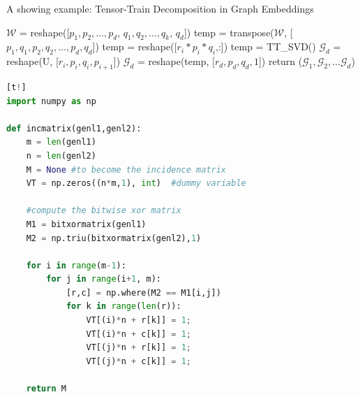 \begin{algorithm} [t]
\footnotesize
  \SetAlgoLined
  \DontPrintSemicolon
  \caption{A showing example: Tensor-Train Decomposition in Graph Embeddings}
  $\mathcal{W}$ = reshape([$p_1, p_2, \dots, p_d$, $q_1, q_2, \dots, q_k$, $q_d$]) \;
  temp = transpose($\mathcal{W}$, [$p_1, q_1, p_2, q_2, \dots, p_d, q_d$]) \;
   {
    temp = reshape([$r_i * p_i * q_i$,:]) \;
    temp = TT\_SVD() \; 
    $\mathcal{G}_d$ = reshape(U, [$r_i, p_i, q_i, p_{i+1}$]) \;
  }
  $\mathcal{G}_d$ = reshape(temp, [$r_d, p_d, q_d, 1$]) \;
  return ($\mathcal{G}_1, \mathcal{G}_2, \dots \mathcal{G}_d$) \;
  \label{alg:example}
\end{algorithm}



\lstset{style=classicstyle}
\begin{lstlisting}[language=Python, caption=Python example][t!]
import numpy as np
    
def incmatrix(genl1,genl2):
    m = len(genl1)
    n = len(genl2)
    M = None #to become the incidence matrix
    VT = np.zeros((n*m,1), int)  #dummy variable
    
    #compute the bitwise xor matrix
    M1 = bitxormatrix(genl1)
    M2 = np.triu(bitxormatrix(genl2),1) 

    for i in range(m-1):
        for j in range(i+1, m):
            [r,c] = np.where(M2 == M1[i,j])
            for k in range(len(r)):
                VT[(i)*n + r[k]] = 1;
                VT[(i)*n + c[k]] = 1;
                VT[(j)*n + r[k]] = 1;
                VT[(j)*n + c[k]] = 1;
            
    return M
\end{lstlisting}









